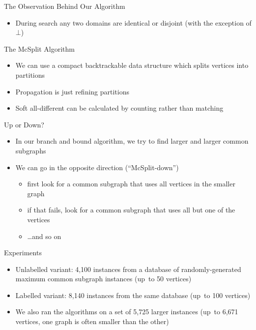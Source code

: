 \documentclass{beamer}
\begin{document}
\begin{frame}{The Observation Behind Our Algorithm}

    \begin{itemize}
        \item During search any two domains are identical or
            disjoint (with the exception of $\bot$)
    \end{itemize}

\end{frame}

\begin{frame}{The McSplit Algorithm}
    \begin{itemize}
        \item We can use a compact backtrackable data structure which splits vertices into
            partitions
        \item Propagation is just refining partitions
        \item Soft all-different can be calculated by counting rather than matching
    \end{itemize}
\end{frame}

\begin{frame}{Up or Down?}
    \begin{itemize}
        \item In our branch and bound algorithm, we try to find larger and larger common subgraphs
        \item We can go in the opposite direction (``McSplit-down'')
          \begin{itemize}
            \item first look for a common subgraph that uses all vertices in the smaller graph
            \item if that fails, look for a common subgraph that uses all but one of the vertices
            \item \dots and so on
          \end{itemize}
    \end{itemize}
\end{frame}

\begin{frame}{Experiments}

    \begin{itemize}
        \item Unlabelled variant: 4,100 instances from a
          database of randomly-generated maximum common subgraph instances (up~to 50 vertices)
        \item Labelled variant: 8,140 instances from the same database (up~to 100 vertices)
        \item We also ran the algorithms on a set of 5,725 larger instances (up~to 6,671 vertices,
            one graph is often smaller than the other)
    \end{itemize}

\end{frame}
\end{document}
